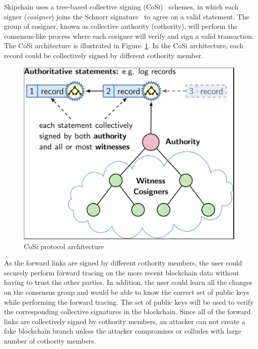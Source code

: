 Skipchain uses a tree-based collective signing (CoSi)~\cite{cosigning} schemes, in which each signer (\textit{cosigner}) joins the Schnorr signature~\cite{schnorrsign} to agree on a valid statement. The group of cosigner, known as collective authority (cothority), will perform the consensus-like process where each cosigner will verify and sign a valid transaction. The CoSi architecture is illustrated in Figure~\ref{fig:cothority}. In the CoSi architecture, each record could be collectively signed by different cothority member.
\begin{figure}[H]
	\begin{center}
		\includegraphics[width=1.0\textwidth]{figures/cosigning.png}
		\caption{CoSi protocol architecture~\cite{cosigning}} 
		\label{fig:cothority}
	\end{center}
\end{figure}

As the forward links are signed by different cothority members, the user could securely perform forward tracing on the more recent blockchain data without having to trust the other parties. In addition, the user could learn all the changes on the consensus group and would be able to know the correct set of public keys while performing the forward tracing. The set of public keys will be used to verify the corresponding collective signatures in the blockchain. Since all of the forward links are collectively signed by cothority members, an attacker can not create a fake blockchain branch unless the attacker compromises or colludes with large number of cothority members.

